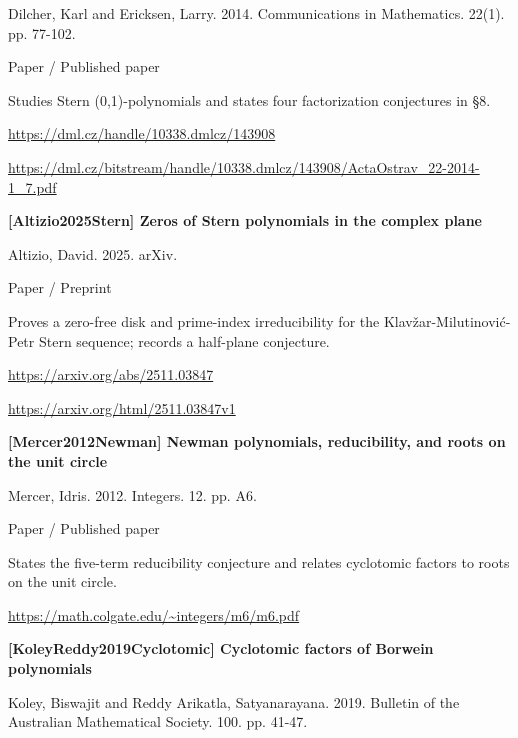 \documentclass[11pt,a4paper,oneside,openany]{book}
\begin{document}
\color{black} Dilcher, Karl and Ericksen, Larry. 2014. Communications in Mathematics. 22(1). pp. 77-102.\par
{\small\sffamily\color{atlasgold}Paper / Published paper}\par
\color{black} Studies Stern (0,1)-polynomials and states four factorization conjectures in §8.\par
{\footnotesize\url{https://dml.cz/handle/10338.dmlcz/143908}}\par
{\footnotesize\url{https://dml.cz/bitstream/handle/10338.dmlcz/143908/ActaOstrav_22-2014-1_7.pdf}}\par
\vspace{9pt}
\hypertarget{ref:Altizio2025Stern}{}
{\sffamily\bfseries\color{atlasgreen}[Altizio2025Stern] Zeros of Stern polynomials in the complex plane}\par
\color{black} Altizio, David. 2025. arXiv.\par
{\small\sffamily\color{atlasgold}Paper / Preprint}\par
\color{black} Proves a zero-free disk and prime-index irreducibility for the Klavžar-Milutinović-Petr Stern sequence; records a half-plane conjecture.\par
{\footnotesize\url{https://arxiv.org/abs/2511.03847}}\par
{\footnotesize\url{https://arxiv.org/html/2511.03847v1}}\par
\vspace{9pt}
\hypertarget{ref:Mercer2012Newman}{}
{\sffamily\bfseries\color{atlasgreen}[Mercer2012Newman] Newman polynomials, reducibility, and roots on the unit circle}\par
\color{black} Mercer, Idris. 2012. Integers. 12. pp. A6.\par
{\small\sffamily\color{atlasgold}Paper / Published paper}\par
\color{black} States the five-term reducibility conjecture and relates cyclotomic factors to roots on the unit circle.\par
{\footnotesize\url{https://math.colgate.edu/~integers/m6/m6.pdf}}\par
\vspace{9pt}
\hypertarget{ref:KoleyReddy2019Cyclotomic}{}
{\sffamily\bfseries\color{atlasgreen}[KoleyReddy2019Cyclotomic] Cyclotomic factors of Borwein polynomials}\par
\color{black} Koley, Biswajit and Reddy Arikatla, Satyanarayana. 2019. Bulletin of the Australian Mathematical Society. 100. pp. 41-47.\par
\end{document}
